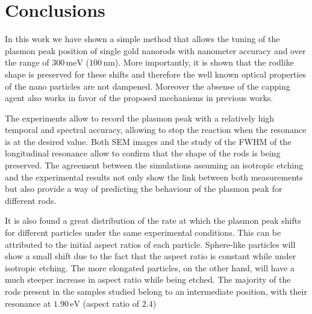 \documentclass{article}
\begin{document}
\section{Conclusions}
In this work we have shown a simple method that allows the tuning of the plasmon
peak position of single gold nanorods with nanometer accuracy and over the range
of $300\,\textrm{meV}$ ($100\,\textrm{nm}$). More importantly, it is shown that
the rodlike shape is preserved for these shifts and therefore the well known
optical properties of the nano particles are not dampened. Moreover the absense
of the capping agent also works in favor of the proposed mechanisms in previous
works.

The experiments allow to record the plasmon peak with a relatively high temporal
and spectral accuracy, allowing to stop the reaction when the resonance is at
the desired value. Both SEM images and the study of the FWHM of the longitudinal
resonance allow to confirm that the shape of the rods is being preserved. The
agreement between the simulations assuming an isotropic etching and the
experimental results not only show the link between both measurements but also
provide a way of predicting the behaviour of the plasmon peak for different
rods.

It is also found a great distribution of the rate at which the plasmon peak
shifts for different particles under the same experimental conditions. This can
be attributed to the initial aspect ratios of each particle. Sphere-like
particles will show a small shift due to the fact that the aspect ratio is
constant while under isotropic etching. The more elongated particles, on the
other hand, will have a much steeper increase in aspect ratio while being
etched. The majority of the rods present in the samples studied belong to an
intermediate position, with their resonance at $1.90\,\textrm{eV}$ (aspect ratio
of $2.4$)

\end{document}
